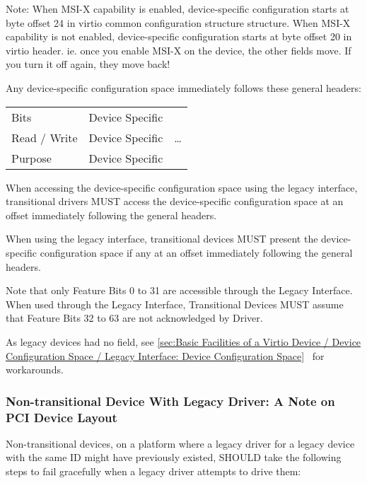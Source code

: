 Note: When MSI-X capability is enabled, device-specific configuration starts at
byte offset 24 in virtio common configuration structure structure. When MSI-X capability is not
enabled, device-specific configuration starts at byte offset 20 in virtio
header.  ie. once you enable MSI-X on the device, the other fields move.
If you turn it off again, they move back!

Any device-specific configuration space immediately follows
these general headers:

\begin{tabular}{|l||l|l|}
\hline
Bits & Device Specific & \multirow{3}{*}{\ldots} \\
\cline{1-2}
Read / Write & Device Specific & \\
\cline{1-2}
Purpose & Device Specific & \\
\hline
\end{tabular}

When accessing the device-specific configuration space
using the legacy interface, transitional
drivers MUST access the device-specific configuration space
at an offset immediately following the general headers.

When using the legacy interface, transitional
devices MUST present the device-specific configuration space
if any at an offset immediately following the general headers.

Note that only Feature Bits 0 to 31 are accessible through the
Legacy Interface. When used through the Legacy Interface,
Transitional Devices MUST assume that Feature Bits 32 to 63
are not acknowledged by Driver.

As legacy devices had no  field,
see \ref{sec:Basic Facilities of a Virtio Device / Device
Configuration Space / Legacy Interface: Device Configuration
Space}~ for workarounds.

\subsubsection{Non-transitional Device With Legacy Driver: A Note
on PCI Device Layout}\label{sec:Virtio Transport Options / Virtio
Over PCI Bus / PCI Device Layout / Non-transitional Device With
Legacy Driver: A Note on PCI Device Layout}

Non-transitional devices, on a platform where a legacy driver for
a legacy device with the same ID might have previously existed,
SHOULD take the following steps to fail gracefully when a legacy
driver attempts to drive them:

